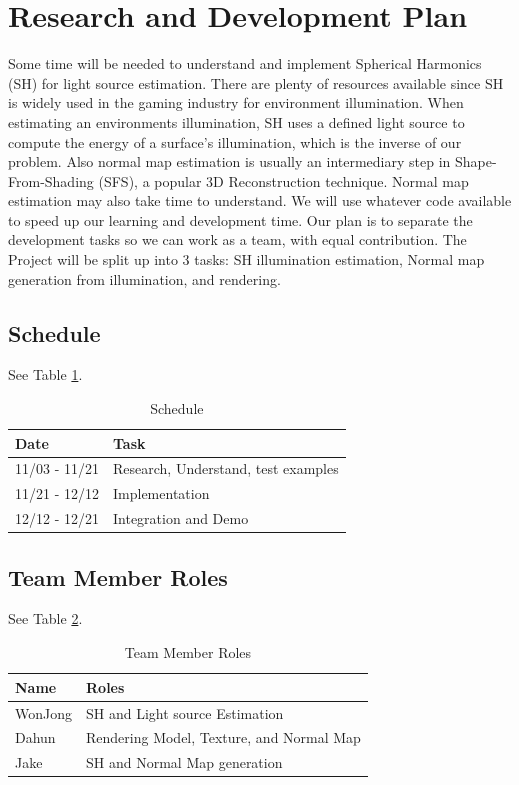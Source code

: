 \documentclass[10pt,twocolumn,letterpaper]{article}
\begin{document}
\section{Research and Development Plan}
Some time will be needed to understand and implement Spherical Harmonics (SH) for light source estimation. There are plenty of resources available since SH is widely used in the gaming industry for environment illumination. When estimating an environments illumination, SH uses a defined light source to compute the energy of a surface's illumination, which is the inverse of our problem. Also normal map estimation is usually an intermediary step in Shape-From-Shading (SFS), a popular 3D Reconstruction technique. Normal map estimation may also take time to understand. We will use whatever code available to speed up our learning and development time. Our plan is to separate the development tasks so we can work as a team, with equal contribution. The Project will be split up into 3 tasks: SH illumination estimation, Normal map generation from illumination, and rendering.

\subsection{Schedule}
See Table \ref{tab:sched}.
\begin{table}[h]
	\begin{tabular}{l|l}
		\textbf{Date} & Task \\
		\hline
		11/03 - 11/21 & Research, Understand, test examples \\
		11/21 - 12/12 & Implementation \\
		12/12 - 12/21 & Integration and Demo \\
		\hline
	\end{tabular}
	\caption{Schedule}
	\label{tab:sched}
\end{table}

\subsection{Team Member Roles}
See Table \ref{tab:roles}.
\begin{table}[h]
	\begin{tabular}{l|l}
		\textbf{Name} & Roles \\
		\hline
		WonJong & SH and Light source Estimation \\
		Dahun & Rendering Model, Texture, and Normal Map \\
		Jake & SH and Normal Map generation \\
		\hline
	\end{tabular}
	\caption{Team Member Roles}
	\label{tab:roles}
\end{table}
\end{document}
